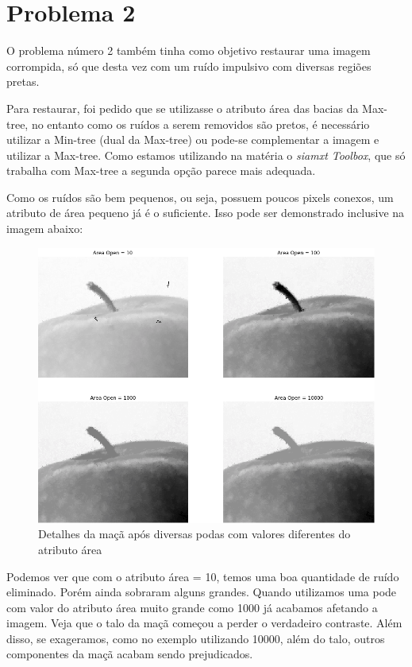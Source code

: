\documentclass{article}
\begin{document}
	
	\section{Problema 2}
	
	O problema número 2 também tinha como objetivo restaurar uma imagem corrompida, só que desta vez com um ruído impulsivo com diversas regiões pretas. 
	
	Para restaurar, foi pedido que se utilizasse o atributo área das bacias da Max-tree, no entanto como os ruídos a serem removidos são pretos, é necessário utilizar a Min-tree (dual da Max-tree) ou pode-se complementar a imagem e utilizar a Max-tree. Como estamos utilizando na matéria o \textit{siamxt Toolbox}, que só trabalha com Max-tree a segunda opção parece mais adequada.
	
	Como os ruídos são bem pequenos, ou seja, possuem poucos pixels conexos, um atributo de área pequeno já é o suficiente. Isso pode ser demonstrado inclusive na imagem abaixo:
	
	\begin{figure}[H]
		\centering
		\includegraphics[scale=0.5]{images/2_maca_1.png}
		\caption{Detalhes da maçã após diversas podas com valores diferentes do atributo área}
	\end{figure}

	Podemos ver que com o atributo área = 10, temos uma boa quantidade de ruído eliminado. Porém ainda sobraram alguns grandes. Quando utilizamos uma pode com valor do atributo área muito grande como 1000 já acabamos afetando a imagem. Veja que o talo da maçã começou a perder o verdadeiro contraste. Além disso, se exageramos, como no exemplo utilizando 10000, além do talo, outros componentes da maçã acabam sendo prejudicados.
	
\end{document}
